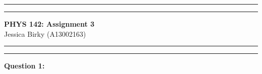\documentclass{article}
\newcommand{\mytitle}{PHYS 142: Assignment 3}
\begin{document}
\hrule \vspace{1pt} \hrule 
\begin{center}\Large \textbf{\sc \mytitle} \\
\normalsize \sc Jessica Birky (A13002163)
\end{center}
\hrule \vspace{1pt} \hrule 


\bigskip
\textbf{Question 1:}
\end{document}
